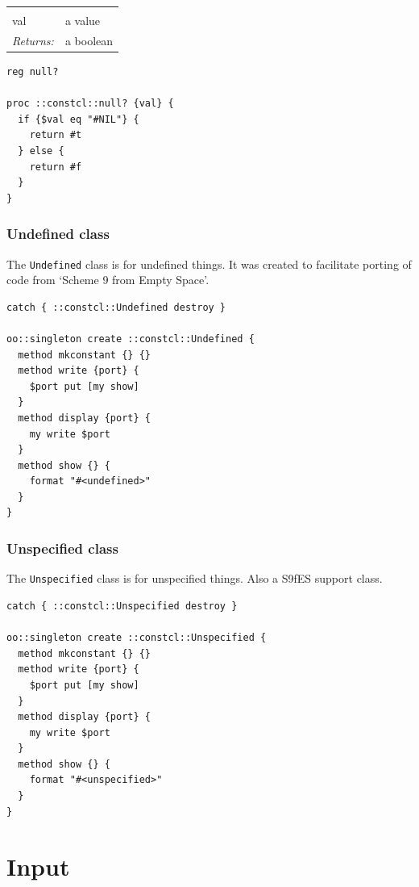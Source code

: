 \documentclass[twoside]{report}
\begin{document}
\noindent\begin{tabular}{ |p{1.9cm} p{8cm}| }
\hline
\rowcolor[HTML]{CCCCCC} \multicolumn{2}{|l|}{\bf null? (public)} \\
val & a value \\
\textit{Returns:} & a boolean \\
\hline
\end{tabular}

\begin{lstlisting}
reg null?

proc ::constcl::null? {val} {
  if {$val eq "#NIL"} {
    return #t
  } else {
    return #f
  }
}
\end{lstlisting}

\subsection{Undefined class}
\label{undefined-class}

The \texttt{Undefined} class is for undefined things. It was created to facilitate porting of code from `Scheme 9 from Empty Space'.

\begin{lstlisting}
catch { ::constcl::Undefined destroy }

oo::singleton create ::constcl::Undefined {
  method mkconstant {} {}
  method write {port} {
    $port put [my show]
  }
  method display {port} {
    my write $port
  }
  method show {} {
    format "#<undefined>"
  }
}
\end{lstlisting}

\subsection{Unspecified class}
\label{unspecified-class}

The \texttt{Unspecified} class is for unspecified things. Also a S9fES support class.

\begin{lstlisting}
catch { ::constcl::Unspecified destroy }

oo::singleton create ::constcl::Unspecified {
  method mkconstant {} {}
  method write {port} {
    $port put [my show]
  }
  method display {port} {
    my write $port
  }
  method show {} {
    format "#<unspecified>"
  }
}
\end{lstlisting}

\chapter{Input}
\label{input}
\end{document}
